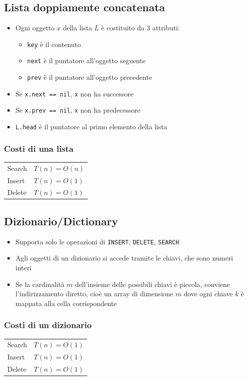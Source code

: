 \documentclass[10pt,a4paper]{article}
\newcommand{\code}{\texttt}
\begin{document}
\begin{multicols*}{2}
\subsection*{Lista doppiamente concatenata}
\begin{itemize}
    \item Ogni oggetto $x$ della lista $L$ è costituito da 3 attributi:
    \begin{itemize}
        \item \code{key} è il contenuto
        \item \code{next} è il puntatore all'oggetto seguente
        \item \code{prev} è il puntatore all'oggetto precedente
    \end{itemize}
    \item Se \code{x.next == nil}, \code{x} non ha successore
    \item Se \code{x.prev == nil}, \code{x} non ha predecessore
    \item \code{L.head} è il puntatore al primo elemento della lista
\end{itemize}
\subsubsection*{Costi di una lista}
\begin{tabular}{l l}
    Search & $T(n) = O(n)$\\
    Insert & $T(n) = O(1)$\\
    Delete & $T(n) = O(1)$\\
\end{tabular}
\subsection*{Dizionario/Dictionary}
\begin{itemize}
    \item Supporta solo le operazioni di \code{INSERT}, \code{DELETE}, \code{SEARCH}
    \item Agli oggetti di un dizionario si accede tramite le chiavi, che sono numeri interi
    \item Se la cardinalità $m$ dell'insieme delle possibili chiavi è piccola, conviene l'indirizzamento diretto, cioè un array di dimensione $m$ dove ogni chiave $k$ è mappata alla cella corrispondente
\end{itemize}
\subsubsection*{Costi di un dizionario}
\begin{tabular}{l l}
    Search & $T(n) = O(1)$\\
    Insert & $T(n) = O(1)$\\
    Delete & $T(n) = O(1)$\\
\end{tabular}

\end{multicols*}
\end{document}
